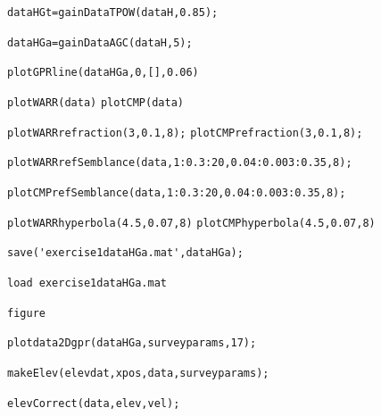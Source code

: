 \documentclass[11pt]{article}
\begin{document}
\qquad \verb#dataHGt=gainDataTPOW(dataH,0.85);#

\qquad \verb#dataHGa=gainDataAGC(dataH,5);#

\qquad \verb#plotGPRline(dataHGa,0,[],0.06)#

\qquad \verb#plotWARR(data)#						\qquad \verb#plotCMP(data)#

\qquad \verb#plotWARRrefraction(3,0.1,8);#			\qquad \verb#plotCMPrefraction(3,0.1,8);#

\qquad \verb#plotWARRrefSemblance(data,1:0.3:20,0.04:0.003:0.35,8);#

\qquad \verb#plotCMPrefSemblance(data,1:0.3:20,0.04:0.003:0.35,8);#

\qquad \verb#plotWARRhyperbola(4.5,0.07,8)#			\qquad \verb#plotCMPhyperbola(4.5,0.07,8)#

\qquad \verb#save('exercise1dataHGa.mat',dataHGa);#

\qquad \verb#load exercise1dataHGa.mat#

\qquad \verb#figure#

\qquad \verb#plotdata2Dgpr(dataHGa,surveyparams,17);#

\qquad \verb#makeElev(elevdat,xpos,data,surveyparams);#

\qquad \verb#elevCorrect(data,elev,vel);#
\end{document}
